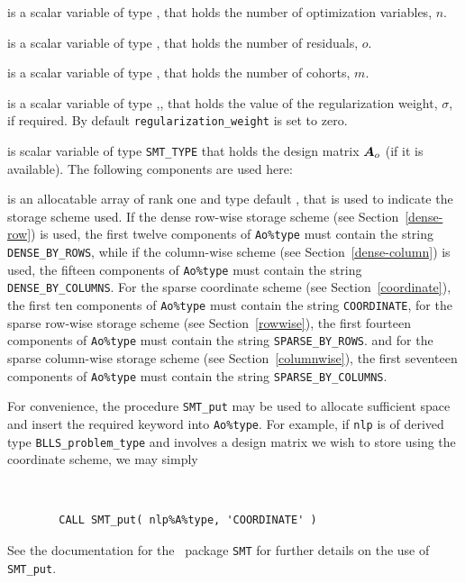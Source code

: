 \documentclass{galahad}
\newcommand{\packagename}{BLLS}
\begin{document}
\begin{description}

 is a scalar variable of type \integer,
 that holds the number of optimization variables, $n$.

 is a scalar variable of type \integer,
 that holds the number of residuals, $o$.

 is a scalar variable of type \integer,
 that holds the number of cohorts, $m$.

 is a scalar variable of type \realdp,,
 that holds the value of the regularization weight, $\sigma$, if required.
 By default {\tt regularization\_weight} is set to zero.

 is scalar variable of type {\tt SMT\_TYPE}
that holds the design matrix ${\bm{A}}_o$ (if it is available).
The following components are used here:

\begin{description}

 is an allocatable array of rank one and type default
\character, that
is used to indicate the storage scheme used. If the dense row-wise
storage scheme (see Section~\ref{dense-row}) is used,
the first twelve components of {\tt Ao\%type} must contain the
string {\tt DENSE\_BY\_ROWS}, while if the column-wise scheme
(see Section~\ref{dense-column}) is used,
the fifteen components of {\tt Ao\%type} must contain the
string {\tt DENSE\_BY\_COLUMNS}.
For the sparse coordinate scheme (see Section~\ref{coordinate}),
the first ten components of {\tt Ao\%type} must contain the
string {\tt COORDINATE},
for the sparse row-wise storage scheme (see Section~\ref{rowwise}),
the first fourteen components of {\tt Ao\%type} must contain the
string {\tt SPARSE\_BY\_ROWS}.
and for the sparse column-wise storage scheme (see Section~\ref{columnwise}),
the first seventeen components of {\tt Ao\%type} must contain the
string {\tt SPARSE\_BY\_COLUMNS}.

For convenience, the procedure {\tt SMT\_put}
may be used to allocate sufficient space and insert the required keyword
into {\tt Ao\%type}.
For example, if {\tt nlp} is of derived type {\tt \packagename\_problem\_type}
and involves a design matrix we wish to store using the coordinate scheme,
we may simply
{\tt
\begin{verbatim}
        CALL SMT_put( nlp%A%type, 'COORDINATE' )
\end{verbatim}
}
\noindent
See the documentation for the \galahad\ package {\tt SMT}
for further details on the use of {\tt SMT\_put}.


\end{description}
\end{description}
\end{document}
